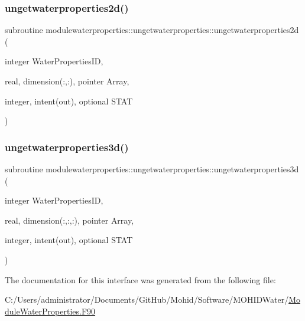\subsubsection{\texorpdfstring{ungetwaterproperties2d()}{ungetwaterproperties2d()}}
{\footnotesize\ttfamily subroutine modulewaterproperties\+::ungetwaterproperties\+::ungetwaterproperties2d (\begin{DoxyParamCaption}\item[{integer}]{Water\+Properties\+ID,  }\item[{real, dimension(\+:,\+:), pointer}]{Array,  }\item[{integer, intent(out), optional}]{S\+T\+AT }\end{DoxyParamCaption})\hspace{0.3cm}{\ttfamily [private]}}

\mbox{\label{interfacemodulewaterproperties_1_1ungetwaterproperties_a42b468e21e2ca11e96d45af483e4b3dc}} 
\subsubsection{\texorpdfstring{ungetwaterproperties3d()}{ungetwaterproperties3d()}}
{\footnotesize\ttfamily subroutine modulewaterproperties\+::ungetwaterproperties\+::ungetwaterproperties3d (\begin{DoxyParamCaption}\item[{integer}]{Water\+Properties\+ID,  }\item[{real, dimension(\+:,\+:,\+:), pointer}]{Array,  }\item[{integer, intent(out), optional}]{S\+T\+AT }\end{DoxyParamCaption})\hspace{0.3cm}{\ttfamily [private]}}



The documentation for this interface was generated from the following file\+:\begin{DoxyCompactItemize}
\item 
C\+:/\+Users/administrator/\+Documents/\+Git\+Hub/\+Mohid/\+Software/\+M\+O\+H\+I\+D\+Water/\mbox{\hyperlink{_module_water_properties_8_f90}{Module\+Water\+Properties.\+F90}}\end{DoxyCompactItemize}
